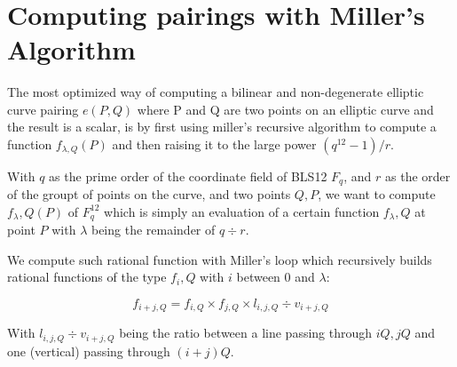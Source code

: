 \documentclass{article}
\begin{document}
\

\section{Computing pairings with Miller's Algorithm}
The most optimized way of computing a bilinear and non-degenerate elliptic curve pairing \( e (P, Q) \) where P and Q are two points on an elliptic curve and the result is a scalar, is by first using miller's recursive algorithm to compute a function \( f_{\lambda, Q}(P)\) and then raising it to the large power \( (q^{12} - 1) / r \).

With \( q \) as the prime order of the coordinate field of BLS12 \( F_q \), and \( r \) as the order of the groupt of points on the curve, and two points \( Q, P \), we want to compute \( f_\lambda, Q (P) \) of \( F_q^{12} \) which is simply an evaluation of a certain function \( f_\lambda, Q \) at point \( P \) with \( \lambda \) being the remainder of \( q \div r \).

We compute such rational function with Miller's loop which recursively builds rational functions of the type \( f_i, Q \) with \( i \) between \( 0 \) and \( \lambda \):

\[ f_{ i + j, Q} = f_{ i, Q } \times f_{ j, Q } \times l_{i, j, Q} \div v_{i + j, Q} \]

With \( l_{i, j, Q} \div v_{i + j, Q} \) being the ratio between a line passing through \( iQ, jQ \) and one (vertical) passing through \( (i + j) Q \).
\end{document}
